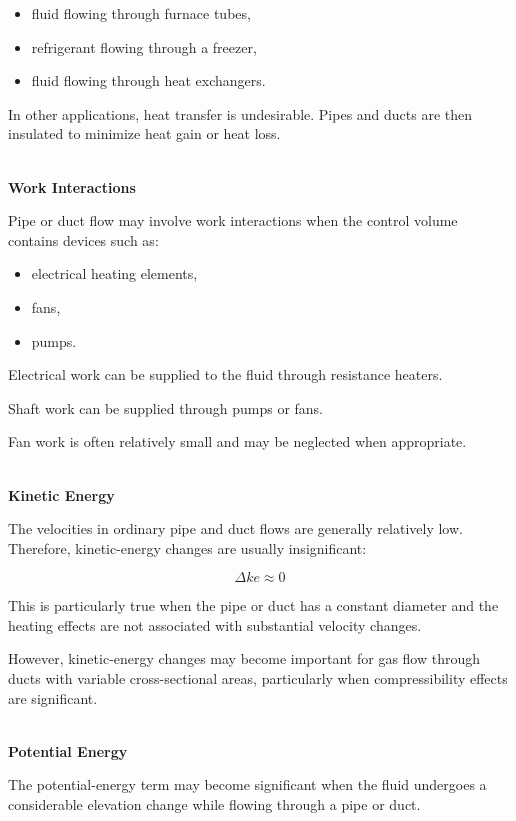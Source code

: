 \documentclass[12pt]{article}
\begin{document}
\begin{itemize}
    \item fluid flowing through furnace tubes,
    \item refrigerant flowing through a freezer,
    \item fluid flowing through heat exchangers.
\end{itemize}

In other applications, heat transfer is undesirable. Pipes and ducts are then insulated to minimize heat gain or heat loss.

\textbf{\\ Work Interactions}

Pipe or duct flow may involve work interactions when the control volume contains devices such as:

\begin{itemize}
    \item electrical heating elements,
    \item fans,
    \item pumps.
\end{itemize}

Electrical work can be supplied to the fluid through resistance heaters.

Shaft work can be supplied through pumps or fans.

Fan work is often relatively small and may be neglected when appropriate.

\textbf{\\ Kinetic Energy}

The velocities in ordinary pipe and duct flows are generally relatively low. Therefore, kinetic-energy changes are usually insignificant:

\begin{equation*}
\Delta ke\approx0
\end{equation*}

This is particularly true when the pipe or duct has a constant diameter and the heating effects are not associated with substantial velocity changes.

However, kinetic-energy changes may become important for gas flow through ducts with variable cross-sectional areas, particularly when compressibility effects are significant.

\textbf{\\ Potential Energy}

The potential-energy term may become significant when the fluid undergoes a considerable elevation change while flowing through a pipe or duct.
\end{document}
